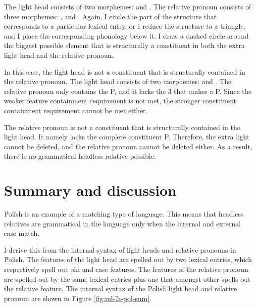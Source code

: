 The light head consists of two morphemes:  and .
The relative pronoun consists of three morphemes: ,  and .
Again, I circle the part of the structure that corresponds to a particular lexical entry, or I reduce the structure to a triangle, and I place the corresponding phonology below it.
I draw a dashed circle around the biggest possible element that is structurally a constituent in both the extra light head and the relative pronoun.

In this case, the light head is not a constituent that is structurally contained in the relative pronoun.
The light head consists of two morphemes:  and .
The relative pronoun only contains the P, and it lacks the 3 that makes a P. Since the weaker feature containment requirement is not met, the stronger constituent containment requirement cannot be met either.

The relative pronoun is not a constituent that is structurally contained in the light head. It namely lacks the complete constituent P.
Therefore, the extra light cannot be deleted, and the relative pronoun cannot be deleted either.
As a result, there is no grammatical headless relative possible.

\section{Summary and discussion}

Polish is an example of a matching type of language. This means that headless relatives are grammatical in the language only when the internal and external case match.

I derive this from the internal syntax of light heads and relative pronouns in Polish. The features of the light head are spelled out by two lexical entries, which respectively spell out phi and case features. The features of the relative pronoun are spelled out by the same lexical entries plus one that amongst other spells out the relative feature. The internal syntax of the Polish light head and relative pronoun are shown in Figure \ref{fig:rel-lh-pol-sum}.


